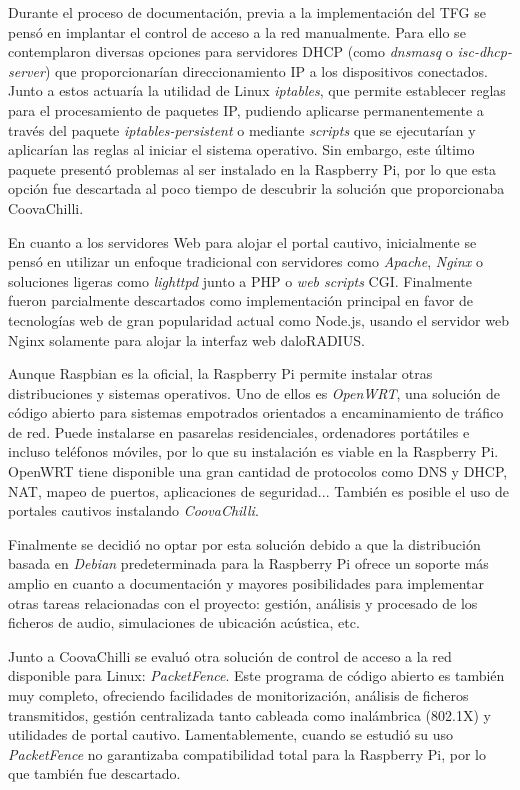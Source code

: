 \begin{appendices}
Durante el proceso de documentación, previa a la implementación del TFG se pensó en implantar el control de acceso a la red manualmente. Para ello se contemplaron diversas opciones para servidores DHCP (como \emph{dnsmasq} o \emph{isc-dhcp-server}) que proporcionarían direccionamiento IP a los dispositivos conectados. Junto a estos actuaría la utilidad de Linux \emph{iptables}, que permite establecer reglas para el procesamiento de paquetes IP, pudiendo aplicarse permanentemente a través del paquete \emph{iptables-persistent} o mediante \emph{scripts} que se ejecutarían y aplicarían las reglas al iniciar el sistema operativo. Sin embargo, este último paquete presentó problemas al ser instalado en la Raspberry Pi, por lo que esta opción fue descartada al poco tiempo de descubrir la solución que proporcionaba CoovaChilli.

En cuanto a los servidores Web para alojar el portal cautivo, inicialmente se pensó en utilizar un enfoque tradicional con servidores como \emph{Apache}, \emph{Nginx} o soluciones ligeras como \emph{lighttpd} junto a PHP o \emph{web scripts} CGI. Finalmente fueron parcialmente descartados como implementación principal en favor de tecnologías web de gran popularidad actual como Node.js, usando el servidor web Nginx solamente para alojar la interfaz web daloRADIUS.

Aunque Raspbian es la oficial, la Raspberry Pi permite instalar otras distribuciones y sistemas operativos. Uno de ellos es \emph{OpenWRT}, una solución de código abierto para sistemas empotrados orientados a encaminamiento de tráfico de red. Puede instalarse en pasarelas residenciales, ordenadores portátiles e incluso teléfonos móviles, por lo que su instalación es viable en la Raspberry Pi. OpenWRT tiene disponible una gran cantidad de protocolos como DNS y DHCP, \acrshort{NAT}, mapeo de puertos, aplicaciones de seguridad... También es posible el uso de portales cautivos instalando \emph{CoovaChilli}.

Finalmente se decidió no optar por esta solución debido a que la distribución basada en \emph{Debian} predeterminada para la Raspberry Pi ofrece un soporte más amplio en cuanto a documentación y mayores posibilidades para implementar otras tareas relacionadas con el proyecto: gestión, análisis y procesado de los ficheros de audio, simulaciones de ubicación acústica, etc.

Junto a CoovaChilli se evaluó otra solución de control de acceso a la red disponible para Linux: \emph{PacketFence}. Este programa de código abierto es también muy completo, ofreciendo facilidades de monitorización, análisis de ficheros transmitidos, gestión centralizada tanto cableada como inalámbrica (802.1X) y utilidades de portal cautivo. Lamentablemente, cuando se estudió su uso \emph{PacketFence} no garantizaba compatibilidad total para la Raspberry Pi, por lo que también fue descartado.


\end{appendices}
